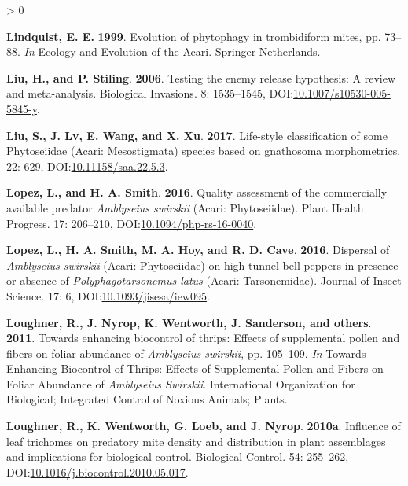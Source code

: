 \documentclass{ufdissertation}[overrideChapters] %
\newlength{\cslhangindent}
\newenvironment{CSLReferences}[2] %
 {%
  \setlength{\parindent}{0pt}
  \ifodd #1 \everypar{\setlength{\hangindent}{\cslhangindent}}\ignorespaces\fi
  \ifnum #2 > 0
  \setlength{\parskip}{#2\baselineskip}
  \fi
 }%
 {}
\begin{document}
{\begin{CSLReferences}{1}{1}
\leavevmode{}%
\textbf{Lindquist, E. E.} \textbf{1999}. \href{https://doi.org/10.1007/978-94-017-1343-6_4}{Evolution of phytophagy in trombidiform mites}, pp. 73--88. \emph{In} Ecology and Evolution of the Acari. Springer Netherlands.

\leavevmode{}%
\textbf{Liu, H., and P. Stiling}. \textbf{2006}. Testing the enemy release hypothesis: A review and meta-analysis. Biological Invasions. 8: 1535--1545, DOI:\href{https://doi.org/10.1007/s10530-005-5845-y}{10.1007/s10530-005-5845-y}.

\leavevmode{}%
\textbf{Liu, S., J. Lv, E. Wang, and X. Xu}. \textbf{2017}. Life-style classification of some {Phytoseiidae} ({Acari}: {Mesostigmata}) species based on gnathosoma morphometrics. 22: 629, DOI:\href{https://doi.org/10.11158/saa.22.5.3}{10.11158/saa.22.5.3}.

\leavevmode{}%
\textbf{Lopez, L., and H. A. Smith}. \textbf{2016}. Quality assessment of the commercially available predator {\emph{Amblyseius swirskii}} ({Acari}: {Phytoseiidae}). Plant Health Progress. 17: 206--210, DOI:\href{https://doi.org/10.1094/php-rs-16-0040}{10.1094/php-rs-16-0040}.

\leavevmode{}%
\textbf{Lopez, L., H. A. Smith, M. A. Hoy, and R. D. Cave}. \textbf{2016}. Dispersal of {\emph{Amblyseius swirskii}} ({Acari}: {Phytoseiidae}) on high-tunnel bell peppers in presence or absence of {\emph{Polyphagotarsonemus latus}} ({Acari}: {Tarsonemidae}). Journal of Insect Science. 17: 6, DOI:\href{https://doi.org/10.1093/jisesa/iew095}{10.1093/jisesa/iew095}.

\leavevmode{}%
\textbf{Loughner, R., J. Nyrop, K. Wentworth, J. Sanderson, and others}. \textbf{2011}. Towards enhancing biocontrol of thrips: Effects of supplemental pollen and fibers on foliar abundance of {\emph{Amblyseius swirskii}}, pp. 105--109. \emph{In} Towards Enhancing Biocontrol of Thrips: Effects of Supplemental Pollen and Fibers on Foliar Abundance of {\emph{Amblyseius Swirskii}}. International Organization for Biological; Integrated Control of Noxious Animals; Plants.

\leavevmode{}%
\textbf{Loughner, R., K. Wentworth, G. Loeb, and J. Nyrop}. \textbf{2010a}. Influence of leaf trichomes on predatory mite density and distribution in plant assemblages and implications for biological control. Biological Control. 54: 255--262, DOI:\href{https://doi.org/10.1016/j.biocontrol.2010.05.017}{10.1016/j.biocontrol.2010.05.017}.


\end{CSLReferences}}
\end{document}
